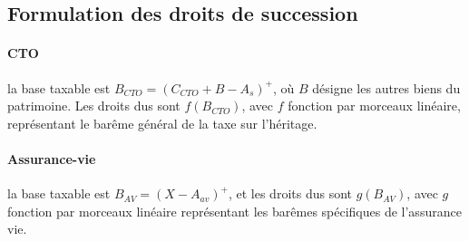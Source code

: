 \subsection{Formulation des droits de succession}
\label{sec:formulation_droits}

\paragraph{CTO} la base taxable est \(B_{CTO} = (C_{CTO} + B - A_s)^+\), où \(B\) désigne les autres biens du patrimoine. Les droits dus sont \(f(B_{CTO})\), avec \(f\) fonction par morceaux linéaire, représentant le barême général de la taxe sur l'héritage.

\paragraph{Assurance-vie} la base taxable est \(B_{AV} = (X - A_{av})^+\), et les droits dus sont \(g(B_{AV})\), avec \(g\) fonction par morceaux linéaire représentant les barêmes spécifiques de l'assurance vie.

